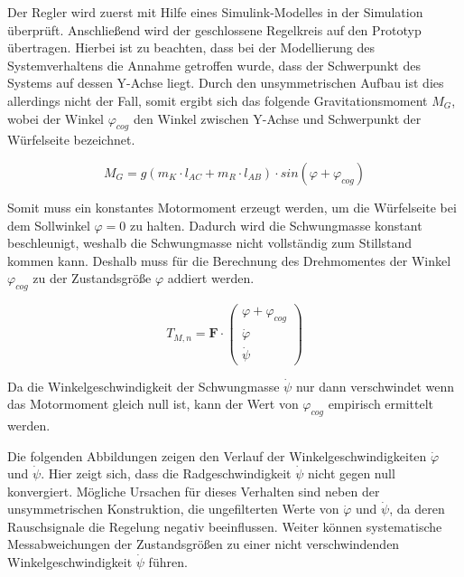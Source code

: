 Der Regler wird zuerst mit Hilfe eines Simulink-Modelles in der Simulation überprüft. Anschließend wird der geschlossene Regelkreis auf den Prototyp übertragen. Hierbei ist zu beachten, dass bei der Modellierung des Systemverhaltens die Annahme getroffen wurde, dass der Schwerpunkt des Systems auf dessen Y-Achse liegt. Durch den unsymmetrischen Aufbau ist dies allerdings nicht der Fall, somit ergibt sich das folgende Gravitationsmoment  $M_G$, wobei der Winkel $\varphi_{cog}$ den Winkel zwischen Y-Achse und Schwerpunkt der Würfelseite bezeichnet.

\begin{equation}
M_G = g(m_K \cdot l_{AC} + m_R \cdot l_{AB}) \cdot sin(\varphi + \varphi_{cog})
\end{equation}

Somit muss ein konstantes Motormoment erzeugt werden, um die Würfelseite bei dem Sollwinkel $\varphi = 0$ zu halten. Dadurch wird die Schwungmasse konstant beschleunigt, weshalb die Schwungmasse nicht vollständig zum Stillstand kommen kann. Deshalb muss für die Berechnung des Drehmomentes der Winkel $\varphi_{cog}$ zu der Zustandsgröße $\varphi$ addiert werden.

\begin{equation}
T_{M,n} = \boldsymbol{F} \cdot \begin{pmatrix}
\varphi + \varphi_{cog} \\
\dot{\varphi} \\
\dot{\psi}
\end{pmatrix}
\end{equation}

Da die Winkelgeschwindigkeit der Schwungmasse $\dot{\psi}$ nur dann verschwindet wenn das Motormoment gleich null ist, kann der Wert von $\varphi_{cog}$ empirisch ermittelt werden.

Die folgenden Abbildungen zeigen den Verlauf der Winkelgeschwindigkeiten $\dot{\varphi}$ und $\dot{\psi}$. Hier zeigt sich, dass die Radgeschwindigkeit $\dot{\psi}$ nicht gegen null konvergiert. Mögliche Ursachen für dieses Verhalten sind neben der unsymmetrischen Konstruktion, die ungefilterten Werte von $\dot{\varphi}$ und $\dot{\psi}$, da deren Rauschsignale die Regelung negativ beeinflussen. Weiter können systematische Messabweichungen der Zustandsgrößen zu einer nicht verschwindenden Winkelgeschwindigkeit $\dot{\psi}$ führen.

